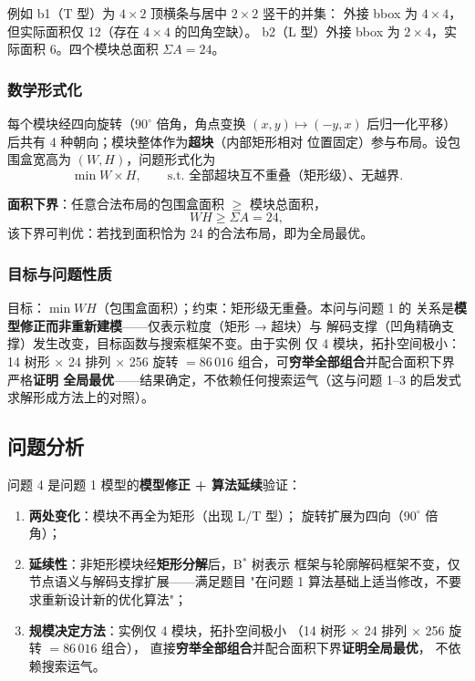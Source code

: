 \documentclass[12pt,a4paper]{article}
\begin{document}
例如 b1（T 型）为 $4\times2$ 顶横条与居中 $2\times2$ 竖干的并集：
外接 bbox 为 $4\times4$，但实际面积仅 12（存在 $4\times4$ 的凹角空缺）。
b2（L 型）外接 bbox 为 $2\times4$，实际面积 6。四个模块总面积
$\Sigma A = 24$。

\subsubsection*{数学形式化}

每个模块经四向旋转（$90^\circ$ 倍角，角点变换 $(x,y) \mapsto (-y,x)$
后归一化平移）后共有 4 种朝向；模块整体作为\textbf{超块}（内部矩形相对
位置固定）参与布局。设包围盒宽高为 $(W, H)$，问题形式化为
\begin{equation}
\min W \times H, \qquad \text{s.t. 全部超块互不重叠（矩形级）、无越界}.
\end{equation}

\textbf{面积下界}：任意合法布局的包围盒面积 $\ge$ 模块总面积，
\begin{equation}
WH \ge \Sigma A = 24,
\end{equation}
该下界可判优：若找到面积恰为 24 的合法布局，即为全局最优。

\subsubsection*{目标与问题性质}

目标：$\min WH$（包围盒面积）；约束：矩形级无重叠。本问与问题 1 的
关系是\textbf{模型修正而非重新建模}——仅表示粒度（矩形 → 超块）与
解码支撑（凹角精确支撑）发生改变，目标函数与搜索框架不变。由于实例
仅 4 模块，拓扑空间极小：14 树形 $\times$ 24 排列 $\times$ 256 旋转
$= 86\,016$ 组合，可\textbf{穷举全部组合}并配合面积下界严格\textbf{证明
全局最优}——结果确定，不依赖任何搜索运气（这与问题 1--3 的启发式
求解形成方法上的对照）。

\subsection{问题分析}

问题 4 是问题 1 模型的\textbf{模型修正 + 算法延续}验证：

\begin{enumerate}
    \item \textbf{两处变化}：模块不再全为矩形（出现 L/T 型）；
    旋转扩展为四向（$90^\circ$ 倍角）；
    \item \textbf{延续性}：非矩形模块经\textbf{矩形分解}后，B$^*$ 树表示
    框架与轮廓解码框架不变，仅节点语义与解码支撑扩展——满足题目
    "在问题 1 算法基础上适当修改，不要求重新设计新的优化算法"；
    \item \textbf{规模决定方法}：实例仅 4 模块，拓扑空间极小
    （14 树形 $\times$ 24 排列 $\times$ 256 旋转 $= 86\,016$ 组合），
    直接\textbf{穷举全部组合}并配合面积下界\textbf{证明全局最优}，
    不依赖搜索运气。
\end{enumerate}
\end{document}
